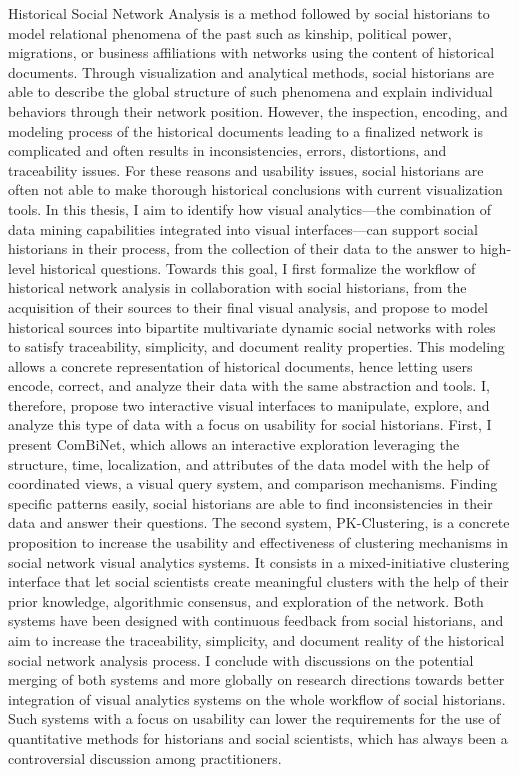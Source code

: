\newcommand{\abstracteng}{
Historical Social Network Analysis is a method followed by social historians to model relational phenomena of the past such as kinship, political power, migrations, or business affiliations with networks using the content of historical documents.
Through visualization and analytical methods, social historians are able to describe the global structure of such phenomena and explain individual behaviors through their network position.
However, the inspection, encoding, and modeling process of the historical documents leading to a finalized network is complicated and often results in inconsistencies, errors, distortions, and traceability issues.
For these reasons and usability issues, social historians are often not able to make thorough historical conclusions with current visualization tools. 
In this thesis, I aim to identify how visual analytics---the combination of data mining capabilities integrated into visual interfaces---can support social historians in their process, from the collection of their data to the answer to high-level historical questions.
Towards this goal, I first formalize the workflow of historical network analysis in collaboration with social historians, from the acquisition of their sources to their final visual analysis, and propose to model historical sources into bipartite multivariate dynamic social networks with roles to satisfy traceability, simplicity, and document reality properties.
This modeling allows a concrete representation of historical documents, hence letting users encode, correct, and analyze their data with the same abstraction and tools.
I, therefore, propose two interactive visual interfaces to manipulate, explore, and analyze this type of data with a focus on usability for social historians.
First, I present ComBiNet, which allows an interactive exploration leveraging the structure, time, localization, and attributes of the data model with the help of coordinated views, a visual query system, and comparison mechanisms. 
Finding specific patterns easily, social historians are able to find inconsistencies in their data and answer their questions.
The second system, PK-Clustering, is a concrete proposition to increase the usability and effectiveness of clustering mechanisms in social network visual analytics systems. It consists in a mixed-initiative clustering interface that let social scientists create meaningful clusters with the help of their prior knowledge, algorithmic consensus, and exploration of the network.
Both systems have been designed with continuous feedback from social historians, and aim to increase the traceability, simplicity, and document reality of the historical social network analysis process.
I conclude with discussions on the potential merging of both systems and more globally on research directions towards better integration of visual analytics systems on the whole workflow of social historians.
Such systems with a focus on usability can lower the requirements for the use of quantitative methods for historians and social scientists, which has always been a controversial discussion among practitioners.









}

\abstracteng